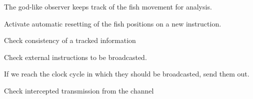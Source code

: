 \documentclass[letterpaper,10pt,english]{sphinxmanual}
\begin{document}
\begin{fulllineitems}
\label{\detokenize{index:observer.Observer}}
The god-like observer keeps track of the fish movement for analysis.

\begin{fulllineitems}
\label{\detokenize{index:observer.Observer.activate_reset}}
Activate automatic resetting of the fish positions on a new
instruction.

\end{fulllineitems}


\begin{fulllineitems}
\label{\detokenize{index:observer.Observer.check_info_consistency}}
Check consistency of a tracked information

\end{fulllineitems}


\begin{fulllineitems}
\label{\detokenize{index:observer.Observer.check_instructions}}
Check external instructions to be broadcasted.

If we reach the clock cycle in which they should be broadcasted, send
them out.

\end{fulllineitems}


\begin{fulllineitems}
\label{\detokenize{index:observer.Observer.check_transmissions}}
Check intercepted transmission from the channel


\end{fulllineitems}
\end{fulllineitems}
\end{document}
